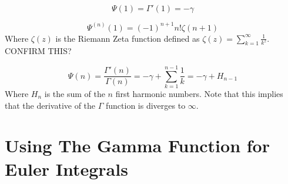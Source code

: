 \documentclass[a4paper]{article}
\begin{document}
    \begin{equation}
        \Psi(1) = \Gamma'(1) = - \gamma \label{eq:equation15}
    \end{equation}

    \begin{equation}
        \Psi^{(n)}(1) = (-1)^{n+1} n! \zeta(n+1) \label{eq:equation16}
    \end{equation}
    Where $\zeta(z)$ is the Riemann Zeta function defined as $\zeta(z) = \sum_{k=1}^{\infty} \frac{1}{k^z}$.
    CONFIRM THIS?

    \begin{equation}
        \Psi(n) = \frac{\Gamma'(n)}{\Gamma(n)} = -\gamma + \sum_{k=1}^{n-1} \frac{1}{k} = -\gamma + H_{n-1} \label{eq:equation17}
    \end{equation}
    Where $H_{n}$ is the sum of the $n$ first harmonic numbers.
    Note that this implies that the derivative of the $\Gamma$ function is diverges to $\infty$.


    \section{Using The Gamma Function for Euler Integrals} \label{sec:using-the-gamma-function-for-euler-integrals}
\end{document}
